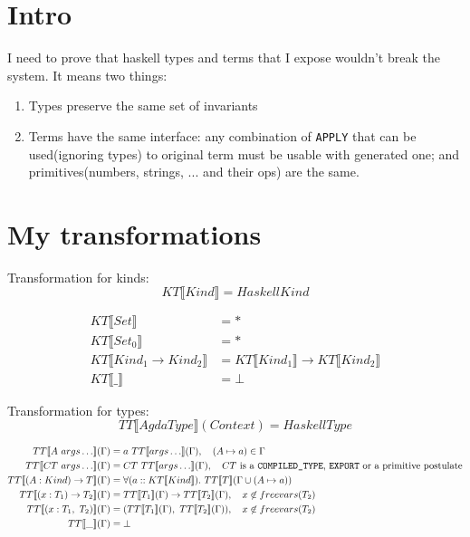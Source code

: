 \section{Intro}

I need to prove that haskell types and terms that I expose wouldn't break the system.  It means two things:
\begin{enumerate}
\item Types preserve the same set of invariants
\item Terms have the same interface: any combination of \texttt{APPLY} that can be used(ignoring types) to original
      term must be usable with generated one; and primitives(numbers, strings, ... and their ops) are the same.
\end{enumerate}

\section{My transformations}

Transformation for kinds:
\[ KT\llbracket Kind \rrbracket = HaskellKind \]

\begin{align*}
   KT\llbracket Set \rrbracket &= *\\
   KT\llbracket Set_0 \rrbracket &= *\\
   KT\llbracket Kind_1 \rightarrow Kind_2 \rrbracket &=
      KT\llbracket Kind_1 \rrbracket \rightarrow KT\llbracket Kind_2 \rrbracket\\
   KT\llbracket \_ \rrbracket &= \bot
\end{align*}

Transformation for types:
\[ TT\llbracket AgdaType \rrbracket(Context) = HaskellType \]

\begin{align*}
   TT\llbracket A\ args\ldots \rrbracket(\Gamma) &= a\ TT\llbracket args\ldots \rrbracket(\Gamma),
      \quad (A \mapsto a) \in \Gamma \\
   TT\llbracket CT\ args\ldots \rrbracket(\Gamma) &= CT\ TT\llbracket args\ldots \rrbracket(\Gamma),
      \quad CT\text{ is a \texttt{COMPILED\_TYPE}, \texttt{EXPORT} or a primitive postulate}\\
   TT\llbracket (A : Kind) \rightarrow T \rrbracket(\Gamma) &= \forall (a :: KT\llbracket Kind \rrbracket).
      \ TT\llbracket T \rrbracket(\Gamma \cup (A \mapsto a))\\
   TT\llbracket (x : T_1) \rightarrow T_2 \rrbracket(\Gamma) &=
      TT\llbracket T_1 \rrbracket(\Gamma) \rightarrow TT\llbracket T_2 \rrbracket(\Gamma),
      \quad x \not\in freevars(T_2) \\
   TT\llbracket (x : T_1,\ T_2) \rrbracket(\Gamma) &=
      (TT\llbracket T_1 \rrbracket(\Gamma),\ TT\llbracket T_2 \rrbracket(\Gamma)),
      \quad x \not\in freevars(T_2) \\
   TT\llbracket \_ \rrbracket(\Gamma) &= \bot\\
\end{align*}

